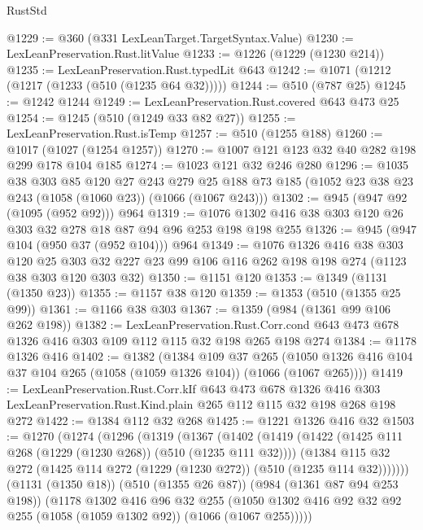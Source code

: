 \begin{lexlean}{RustStd}
\begin{coremodule}
@1229 := @360 (@331 LexLeanTarget.TargetSyntax.Value)
@1230 := LexLeanPreservation.Rust.litValue
@1233 := @1226 (@1229 (@1230 @214))
@1235 := LexLeanPreservation.Rust.typedLit @643
@1242 := @1071 (@1212 (@1217 (@1233 (@510 (@1235 @64 @32)))))
@1244 := @510 (@787 @25)
@1245 := @1242 @1244
@1249 := LexLeanPreservation.Rust.covered @643 @473 @25
@1254 := @1245 (@510 (@1249 @33 @82 @27))
@1255 := LexLeanPreservation.Rust.isTemp
@1257 := @510 (@1255 @188)
@1260 := @1017 (@1027 (@1254 @1257))
@1270 := @1007 @121 @123 @32 @40 @282 @198 @299 @178 @104 @185
@1274 := @1023 @121 @32 @246 @280
@1296 := @1035
    @38
    @303
    @85
    @120
    @27
    @243
    @279
    @25
    @188
    @73
    @185
    (@1052 @23 @38 @23 @243 (@1058 (@1060 @23)) (@1066 (@1067 @243)))
@1302 := @945 (@947 @92 (@1095 (@952 @92))) @964
@1319 := @1076 @1302 @416 @38 @303 @120 @26 @303 @32 @278 @18 @87 @94 @96 @253 @198 @198 @255
@1326 := @945 (@947 @104 (@950 @37 (@952 @104))) @964
@1349 := @1076
    @1326
    @416
    @38
    @303
    @120
    @25
    @303
    @32
    @227
    @23
    @99
    @106
    @116
    @262
    @198
    @198
    @274
    (@1123 @38 @303 @120 @303 @32)
@1350 := @1151 @120
@1353 := @1349 (@1131 (@1350 @23))
@1355 := @1157 @38 @120
@1359 := @1353 (@510 (@1355 @25 @99))
@1361 := @1166 @38 @303
@1367 := @1359 (@984 (@1361 @99 @106 @262 @198))
@1382 := LexLeanPreservation.Rust.Corr.cond
    @643
    @473
    @678
    @1326
    @416
    @303
    @109
    @112
    @115
    @32
    @198
    @265
    @198
    @274
@1384 := @1178 @1326 @416
@1402 := @1382
    (@1384
      @109
      @37
      @265
      (@1050 @1326 @416 @104 @37 @104 @265 (@1058 (@1059 @1326 @104)) (@1066 (@1067 @265))))
@1419 := LexLeanPreservation.Rust.Corr.kIf
    @643
    @473
    @678
    @1326
    @416
    @303
    LexLeanPreservation.Rust.Kind.plain
    @265
    @112
    @115
    @32
    @198
    @268
    @198
    @272
@1422 := @1384 @112 @32 @268
@1425 := @1221 @1326 @416 @32
@1503 := @1270
    (@1274
      (@1296
        (@1319
          (@1367
            (@1402
              (@1419
                (@1422 (@1425 @111 @268 (@1229 (@1230 @268)) (@510 (@1235 @111 @32))))
                (@1384
                  @115
                  @32
                  @272
                  (@1425 @114 @272 (@1229 (@1230 @272)) (@510 (@1235 @114 @32)))))))
          (@1131 (@1350 @18))
          (@510 (@1355 @26 @87))
          (@984 (@1361 @87 @94 @253 @198))
          (@1178
            @1302
            @416
            @96
            @32
            @255
            (@1050 @1302 @416 @92 @32 @92 @255 (@1058 (@1059 @1302 @92)) (@1066 (@1067 @255)))))

\end{coremodule}
\end{lexlean}
